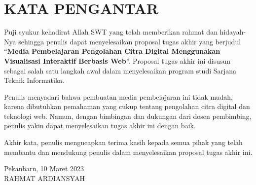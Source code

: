 \chapter*{KATA PENGANTAR}

Puji syukur kehadirat Allah SWT yang telah memberikan rahmat dan hidayah-Nya sehingga penulis dapat menyelesaikan proposal tugas akhir yang berjudul ``\textbf{Media Pembelajaran Pengolahan Citra Digital Menggunakan Visualisasi Interaktif Berbasis Web}''. Proposal tugas akhir ini disusun sebagai salah satu langkah awal dalam menyelesaikan program studi Sarjana Teknik Informatika.

Penulis menyadari bahwa pembuatan media pembelajaran ini tidak mudah, karena dibutuhkan pemahaman yang cukup tentang pengolahan citra digital dan teknologi web. Namun, dengan bimbingan dan dukungan dari dosen pembimbing, penulis yakin dapat menyelesaikan tugas akhir ini dengan baik.

Akhir kata, penulis mengucapkan terima kasih kepada semua pihak yang telah membantu dan mendukung penulis dalam menyelesaikan proposal tugas akhir ini.

\vspace{1cm}
\begin{flushright}
    Pekanbaru, 10 Maret 2023\\
    \vspace{2.5cm}
    {RAHMAT ARDIANSYAH}\\
\end{flushright}

